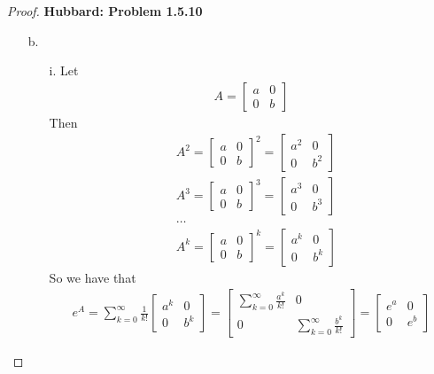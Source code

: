 \documentclass[11pt]{article}
\theoremstyle{definition}
\begin{document}
\begin{proof}{\textbf{Hubbard: Problem 1.5.10}}
\begin{itemize}
    \item[b.]
    \begin{itemize}
        \item [i.] Let
        \begin{align*}
            A = \begin{bmatrix} a & 0 \\ 0 & b \end{bmatrix}
        \end{align*}
        Then 
        \begin{align*}
            &A^2 = \begin{bmatrix} a & 0 \\ 0 & b \end{bmatrix}^2
            = \begin{bmatrix} a^2 & 0 \\ 0 & b^2 \end{bmatrix}\\
            &A^3 = \begin{bmatrix} a & 0 \\ 0 & b \end{bmatrix}^3
            = \begin{bmatrix} a^3 & 0 \\ 0 & b^3 \end{bmatrix}\\
            &\dots\\
            &A^k = \begin{bmatrix} a & 0 \\ 0 & b \end{bmatrix}^k
            = \begin{bmatrix} a^k & 0 \\ 0 & b^k \end{bmatrix}
        \end{align*}
        So we have that
        \begin{align*}
            e^A = \sum_{k=0}^\infty \frac{1}{k!}
            \begin{bmatrix} a^k & 0 \\ 0 & b^k \end{bmatrix}
            =\begin{bmatrix} \sum_{k=0}^\infty \frac{a^k}{k!} & 0 \\
            0 & \sum_{k=0}^\infty \frac{b^k}{k!} \end{bmatrix}
            =\begin{bmatrix} e^a & 0 \\ 0 & e^b \end{bmatrix}

\end{align*}
\end{itemize}
\end{itemize}
\end{proof}
\end{document}
